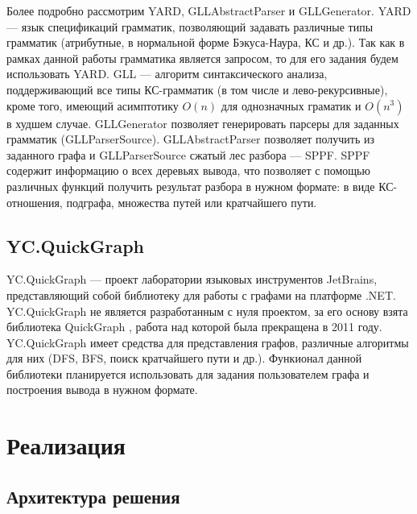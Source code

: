 \documentclass[14pt]{matmex-diploma-custom}
\begin{document}
	    Более подробно рассмотрим YARD, GLLAbstractParser и GLLGenerator. YARD --- язык спецификаций грамматик, позволяющий задавать различные типы грамматик (атрибутные, в нормальной форме Бэкуса-Наура, КС и др.). Так как в рамках данной работы грамматика является запросом, то для его задания будем использовать YARD. GLL --- алгоритм синтаксического анализа, поддерживающий все типы КС-грамматик (в том числе и лево-рекурсивные), кроме того, имеющий асимптотику \(O(n)\) для однозначных граматик и \(O(n^3)\) в худшем случае. GLLGenerator позволяет генерировать парсеры для заданных грамматик (GLLParserSource). GLLAbstractParser позволяет получить из заданного графа и GLLParserSource сжатый лес разбора --- SPPF. SPPF содержит информацию о всех деревьях вывода, что позволяет с помощью различных функций получить результат разбора в нужном формате: в виде КС-отношения, подграфа, множества путей или кратчайшего пути.
	    
	\subsection{YC.QuickGraph}
	    YC.QuickGraph --- проект лаборатории языковых инструментов JetBrains, представляющий собой библиотеку для работы с графами на платформе .NET. YC.QuickGraph не является разработанным с нуля проектом, за его основу взята библиотека QuickGraph \cite{quickgraph}, работа над которой была прекращена в 2011 году. YC.QuickGraph имеет средства для представления графов, различные алгоритмы для них (DFS, BFS, поиск кратчайшего пути и др.). Функионал данной библиотеки планируется использовать для задания пользователем графа и построения вывода в нужном формате.
\section{Реализация}

    \subsection{Архитектура решения}
    
\end{document}
